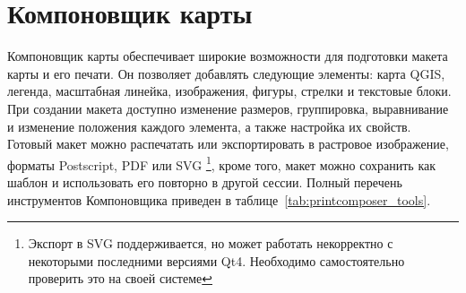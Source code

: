 
\chapter{Компоновщик карты}\label{label_printcomposer}


Компоновщик карты обеспечивает широкие возможности для подготовки
макета карты и его печати. Он позволяет добавлять следующие элементы: карта QGIS, легенда,
масштабная линейка, изображения, фигуры, стрелки и текстовые блоки. При
создании макета доступно изменение размеров, группировка, выравнивание и
изменение положения каждого элемента, а также настройка их свойств.
Готовый макет можно распечатать или экспортировать в растровое изображение,
форматы Postscript, PDF или SVG \footnote{Экспорт в SVG поддерживается,
но может работать некорректно с некоторыми последними версиями Qt4.
Необходимо самостоятельно проверить это на своей системе}, кроме того,
макет можно сохранить как шаблон и использовать его повторно в другой
сессии. Полный перечень инструментов Компоновщика приведен в
таблице~\ref{tab:printcomposer_tools}.


